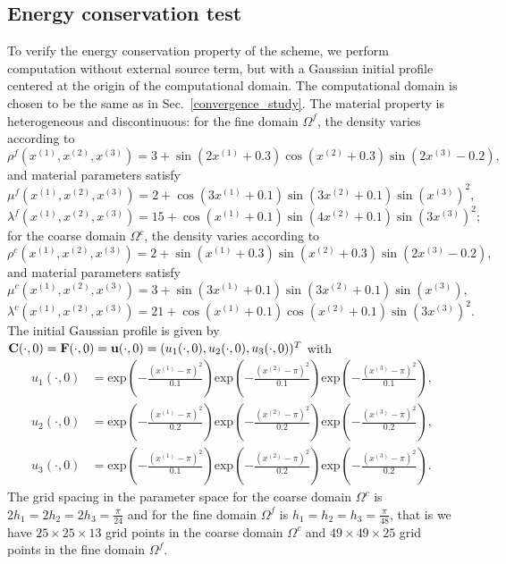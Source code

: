 \subsection{Energy conservation test}\label{conserved_energy}
To verify the energy conservation property of the scheme, we perform computation without external source term, but with a Gaussian initial profile centered at the origin of the computational domain. The computational domain is chosen to be the same as in Sec.~\ref{convergence_study}. The material property is heterogeneous and discontinuous: for the fine domain $\Omega^f$,  the density varies according to
\[\rho^f(x^{(1)},x^{(2)},x^{(3)}) = 3 + \sin(2x^{(1)}+0.3)\cos(x^{(2)}+0.3)\sin(2x^{(3)}-0.2),\] 
and material parameters satisfy
\[\mu^f(x^{(1)},x^{(2)},x^{(3)}) = 2 + \cos(3x^{(1)}+0.1)\sin(3x^{(2)}+0.1)\sin(x^{(3)})^2,\]
\[\lambda^f(x^{(1)},x^{(2)},x^{(3)}) = 15 + \cos(x^{(1)}+0.1)\sin(4x^{(2)}+0.1)\sin(3x^{(3)})^2;\]
for the coarse domain $\Omega^c$, the density varies according to
\[\rho^c(x^{(1)},x^{(2)},x^{(3)}) = 2 + \sin(x^{(1)}+0.3)\sin(x^{(2)}+0.3)\sin(2x^{(3)}-0.2),\] 
and material parameters satisfy
\[\mu^c(x^{(1)},x^{(2)},x^{(3)}) = 3 + \sin(3x^{(1)}+0.1)\sin(3x^{(2)}+0.1)\sin(x^{(3)}),\]
\[\lambda^c(x^{(1)},x^{(2)},x^{(3)}) = 21 + \cos(x^{(1)}+0.1)\cos(x^{(2)}+0.1)\sin(3x^{(3)})^2.\]
The initial Gaussian profile is given by ${\bf C}(\cdot,0) = {\bf F}(\cdot,0) = {\bf u}(\cdot,0) = (u_1(\cdot,0),u_2(\cdot,0),u_3(\cdot,0))^T$ with
\begin{align*}
	u_1(\cdot,0) &= \mbox{exp}\left(-\frac{(x^{(1)}-\pi)^2}{0.1}\right)\mbox{exp}\left(-\frac{(x^{(2)}-\pi)^2}{0.1}\right)\mbox{exp}\left(-\frac{(x^{(3)}-\pi)^2}{0.1}\right),\\
	u_2(\cdot,0) &= \mbox{exp}\left(-\frac{(x^{(1)}-\pi)^2}{0.2}\right)\mbox{exp}\left(-\frac{(x^{(2)}-\pi)^2}{0.2}\right)\mbox{exp}\left(-\frac{(x^{(3)}-\pi)^2}{0.2}\right),\\
	u_3(\cdot,0) &= \mbox{exp}\left(-\frac{(x^{(1)}-\pi)^2}{0.1}\right)\mbox{exp}\left(-\frac{(x^{(2)}-\pi)^2}{0.2}\right)\mbox{exp}\left(-\frac{(x^{(3)}-\pi)^2}{0.2}\right).
\end{align*}
 The grid spacing in the parameter space for the coarse domain $\Omega^c$ is $2h_1 = 2h_2 = 2h_3 = \frac{\pi}{24}$ and for the fine domain $\Omega^f$ is $h_1 = h_2 = h_3 = \frac{\pi}{48}$, that is we have $25\times25\times13$ grid points in the coarse domain $\Omega^c$ and $49\times49\times25$ grid points in the fine domain $\Omega^f$. 

